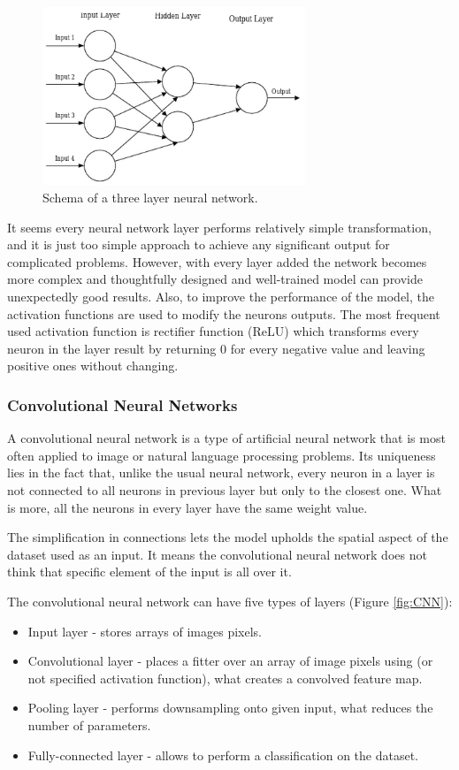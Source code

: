 \documentclass[12pt]{article}
\begin{document}
\begin{figure}
\centering
\includegraphics[width=0.7\textwidth]{ANN.png}
\caption{\label{fig:ANN}Schema of a three layer neural network\cite{7}.}
\end{figure}

It seems every neural network layer performs relatively simple transformation, and it is just too simple approach to achieve any significant output for complicated problems. However, with every layer added the network becomes more complex and thoughtfully designed and well-trained model can provide unexpectedly good results. Also, to improve the performance of the model, the activation functions are used to modify the neurons outputs. The most frequent used activation function is rectifier function (ReLU) which transforms every neuron in the layer result by returning $0$ for every negative value and leaving positive ones without changing\cite{8}.


\subsubsection{Convolutional Neural Networks} 
A convolutional neural network is a type of artificial neural network that is most often applied to image or natural language processing problems. Its uniqueness lies in the fact that, unlike the usual neural network, every neuron in a layer is not connected to all neurons in previous layer but only to the closest one. What is more, all the neurons in every layer have the same weight value.

The simplification in connections lets the model upholds the spatial aspect of the dataset used as an input. It means the convolutional neural network does not think that specific element of the input is all over it.

The convolutional neural network can have five types of layers (Figure \ref{fig:CNN}):
\begin{itemize}
\item Input layer - stores arrays of images pixels.
\item Convolutional layer - places a fitter over an array of image pixels using (or not specified activation function), what creates a convolved feature map.
\item Pooling layer - performs downsampling onto given input, what reduces the number of parameters.
\item Fully-connected layer - allows to perform a classification on the dataset.
\end{itemize}
\end{document}
